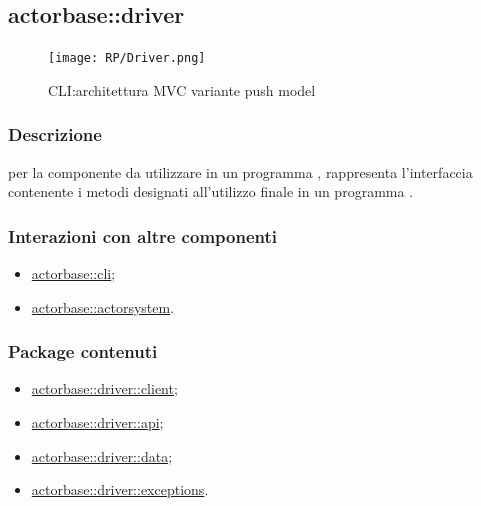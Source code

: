 \documentclass{scalatekids-article}
\begin{document}

\subsection{actorbase::driver}
\label{sec:actorbase::driver}

\begin{figure}[H]
  \begin{center}
    \texttt{[image: RP/Driver.png]}
    \caption{CLI:architettura MVC variante push model}
  \end{center}
\end{figure}

\subsubsection{Descrizione}

 per la componente  da utilizzare in un programma
, rappresenta l'interfaccia contenente i metodi designati
all'utilizzo finale in un programma .

\subsubsection{Interazioni con altre componenti}

\begin{itemize}
\item \hyperref[sec:actorbase::cli]{actorbase::cli};
\item \hyperref[sec:actorbase::actorsystem]{actorbase::actorsystem}.
\end{itemize}

\subsubsection{Package contenuti}

\begin{itemize}
\item \hyperref[sec:actorbase::driver::client]{actorbase::driver::client};
\item \hyperref[sec:actorbase::driver::api]{actorbase::driver::api};
\item \hyperref[sec:actorbase::driver::data]{actorbase::driver::data};
\item \hyperref[sec:actorbase::driver::exceptions]{actorbase::driver::exceptions}.
\end{itemize}
\end{document}

